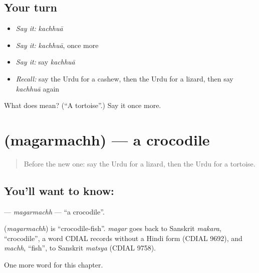 \subsection*{Your turn}
\begin{itemize}
\raggedright
  \item \emph{Say it:} \emph{kachhuā}
  \item \emph{Say it:} \emph{kachhuā}, once more
  \item \emph{Say it:} say \emph{kachhuā}
  \item \emph{Recall:} say the Urdu for a cashew, then the Urdu for a lizard, then say \emph{kachhuā} again
\end{itemize}

\begin{tcolorbox}[breakable,colback=teal!4,colframe=teal!35!black,title={Before you move on}]
What does  mean? (\textquotedblleft{}A tortoise\textquotedblright{}.) Say it once more.
\end{tcolorbox}
\section[\texorpdfstring{\ur{مگرمچھ} (magarmachh)}{مگرمچھ (magarmachh)}]{ (magarmachh) — a crocodile}

\label{lesson:UR-C253-magarmachh}



\begin{quote}
Before the new one: say the Urdu for a lizard, then the Urdu for a tortoise.
\end{quote}

\subsection*{You'll want to know: }
\textbf{} — \emph{magarmachh} — \textquotedblleft{}a crocodile\textquotedblright{}.

\begin{cousinweb}
\textbf{} (\emph{magarmachh}) is \textquotedblleft{}crocodile-fish\textquotedblright{}. \emph{magar} goes back to Sanskrit \emph{makara}, \textquotedblleft{}crocodile\textquotedblright{}, a word CDIAL records without a Hindi form (CDIAL 9692), and \emph{machh}, \textquotedblleft{}fish\textquotedblright{}, to Sanskrit \emph{matsya} (CDIAL 9758).
\end{cousinweb}

\begin{grammarlens}[title={What you've built}]
One more word for this chapter.
\end{grammarlens}

